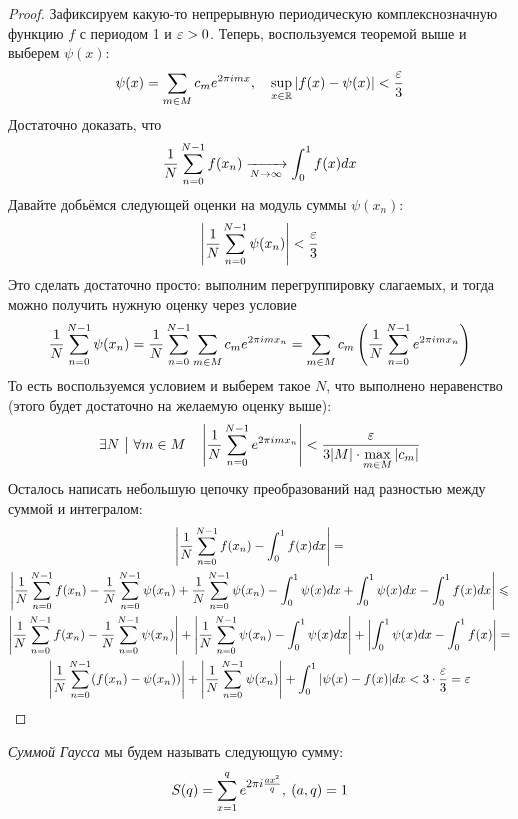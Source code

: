 \begin{proof}
	Зафиксируем какую-то непрерывную периодическую комплекснозначную функцию $f$ с периодом 1 и $\varepsilon > 0$. Теперь, воспользуемся теоремой выше и выберем $\psi(x)$:
	\[
		\psi(x) = \sum\limits_{m \in M} c_m e^{2\pi i mx}, \quad \sup\limits_{x \in \mathbb{R}} |f(x) - \psi(x)| < \frac{\varepsilon}{3}
	\]
	Достаточно доказать, что
	\[
		\frac{1}{N} \sum\limits_{n = 0}^{N - 1} f(x_n) \xrightarrow[N \to \infty]{} \int_0^1 f(x)dx
	\]
	Давайте добьёмся следующей оценки на модуль суммы $\psi(x_n)$:
	\[
		\left|\frac{1}{N}\sum\limits_{n = 0}^{N - 1} \psi(x_n)\right| < \frac{\varepsilon}{3}
	\]
	Это сделать достаточно просто: выполним перегруппировку слагаемых, и тогда можно получить нужную оценку через условие
	\[
		\frac{1}{N}\sum\limits_{n = 0}^{N - 1} \psi(x_n) = \frac{1}{N}\sum\limits_{n = 0}^{N - 1}\sum\limits_{m \in M} c_m e^{2\pi im x_n} = \sum\limits_{m \in M} c_m\left(\frac{1}{N}\sum\limits_{n = 0}^{N - 1} e^{2\pi im x_n}\right)
	\]
	То есть воспользуемся условием и выберем такое $N$, что выполнено неравенство (этого будет достаточно на желаемую оценку выше):
	\[
		\exists N \ \big|\  \forall m \in M \quad \left|\frac{1}{N}\sum\limits_{n = 0}^{N - 1}e^{2\pi im x_n}\right| < \frac{\varepsilon}{3|M| \cdot \max\limits_{m \in M} |c_m|}
	\]
	Осталось написать небольшую цепочку преобразований над разностью между суммой и интегралом:
	\begin{multline*}
		\left|\frac{1}{N} \sum\limits_{n = 0}^{N - 1} f(x_n) - \int_0^1 f(x)dx\right| =
		\\
		\Bigg|\frac{1}{N}\sum\limits_{n = 0}^{N - 1}f(x_n) - \frac{1}{N}\sum\limits_{n = 0}^{N - 1} \psi(x_n) + \frac{1}{N} \sum\limits_{n = 0}^{N - 1} \psi(x_n) - \int_0^1 \psi(x)dx + \int_0^1 \psi(x)dx - \int_0^1 f(x)dx\Bigg| \leqslant
		\\
		\left|\frac{1}{N}\sum\limits_{n = 0}^{N - 1}f(x_n) - \frac{1}{N}\sum\limits_{n = 0}^{N - 1}\psi(x_n)\right| + \left|\frac{1}{N}\sum\limits_{n = 0}^{N - 1}\psi(x_n) - \int_0^1 \psi(x)dx\right| + \left|\int_0^1 \psi(x)dx - \int_0^1 f(x)\right| =
		\\
		\left|\frac{1}{N}\sum\limits_{n = 0}^{N - 1}(f(x_n) - \psi(x_n))\right| + \left|\frac{1}{N}\sum\limits_{n = 0}^{N - 1}\psi(x_n)\right| + \int_0^1 |\psi(x) - f(x)|dx < 3 \cdot \frac{\varepsilon}{3} = \varepsilon
	\end{multline*}
\end{proof}

\begin{definition}
	\textit{Суммой Гаусса} мы будем называть следующую сумму:
	\[
		S(q) = \suml_{x = 1}^q e^{\scalebox{0.85}{$2\pi i \frac{ax^2}{q}$}}, \: (a, q) = 1
	\]
\end{definition}

